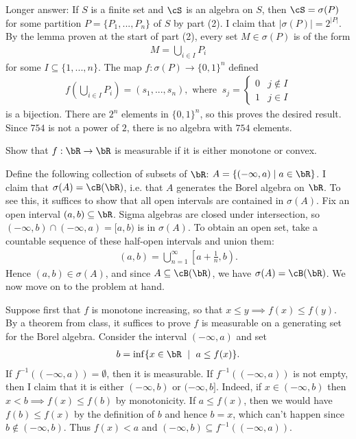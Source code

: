 \begin{homework}[e]
\begin{prf}
\begin{enumerate}[(1)]
				Longer answer: If $S$ is a finite set and $\cS$ is an algebra on $S$, then $\cS = \sigma(P)$ for some partition $P = \{P_1,...,P_n\}$ of $S$ by part (2). I claim that $|\sigma(P)| = 2^{|P|}$. By the lemma proven at the start of part (2), every set $M \in \sigma(P)$ is of the form
				\begin{align*}
					M = \bigcup_{i\in I} P_i
				\end{align*}
				for some $I \subseteq \{1,...,n\}$. The map $f:\sigma(P) \to \{0,1\}^n$ defined
				\begin{align*}
					f\left(\bigcup_{i\in I} P_i\right) = (s_1,...,s_n), \text{ where } ~ s_j =
					\begin{cases}
						0 & j \not\in I \\
						1 & j \in I
					\end{cases}
				\end{align*}
				is a bijection. There are $2^n$ elements in $\{0,1\}^n$, so this proves the desired result. Since $754$ is not a power of $2$, there is no algebra with $754$ elements.
		\end{enumerate}
	\end{prf}
	\prob Show that $f:\bR\to \bR$ is measurable if it is either monotone or convex.
	\begin{prf}
		Define the following collection of subsets of $\bR$: $A = \{(-\infty,a) \mid a \in \bR\}$. I claim that $\sigma(A) = \cB(\bR)$, i.e. that $A$ generates the Borel algebra on $\bR$. To see this, it suffices to show that all open intervals are contained in $\sigma(A)$. Fix an open interval $(a,b) \subseteq \bR$. Sigma algebras are closed under intersection, so $(-\infty, b) \cap (-\infty,a) = [a,b)$ is in $\sigma(A)$. To obtain an open set, take a countable sequence of these half-open intervals and union them:
		\begin{align*}
			(a,b) = \bigcup_{n=1}^\infty \left[a+ \frac{1}{n},b\right).
		\end{align*}
		Hence $(a,b) \in \sigma(A)$, and since $A \subseteq \cB(\bR)$, we have $\sigma(A) = \cB(\bR)$. We now move on to the problem at hand.
		
		Suppose first that $f$ is monotone increasing, so that $x \leq y\implies f(x) \leq f(y)$. By a theorem from class, it suffices to prove $f$ is measurable on a generating set for the Borel algebra. Consider the interval $(-\infty,a)$ and set
		\begin{align*}
			b = \inf \{x \in \bR~\mid~ a \leq f(x)\}.
		\end{align*}
		If $f^{-1}((-\infty,a)) = \emptyset$, then it is measurable. If $f^{-1}((-\infty,a))$ is not empty, then I claim that it is either $(-\infty,b)$ or $(-\infty,b]$. Indeed, if $x \in (-\infty,b)$ then $x < b \implies f(x) \leq f(b)$ by monotonicity. If $a \leq f(x)$, then we would have $f(b) \leq f(x)$ by the definition of $b$ and hence $b = x$, which can't happen since $b\not\in (-\infty,b)$. Thus $f(x) < a$ and $(-\infty,b) \subseteq f^{-1}((-\infty,a))$.


\end{prf}
\end{homework}
